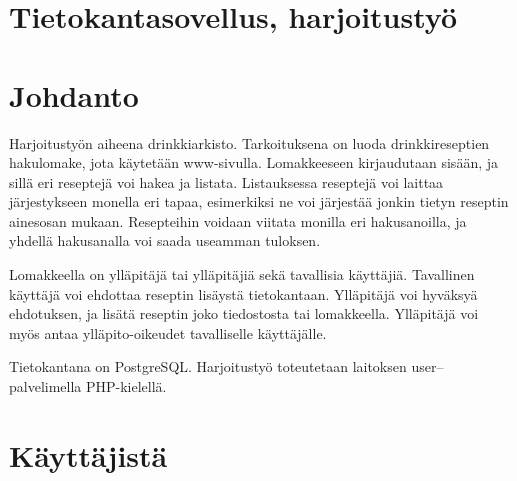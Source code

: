 \documentclass[a4paper]{article}
\begin{document}
\section*{Tietokantasovellus, harjoitustyö}

\tableofcontents

\section{Johdanto}

Harjoitustyön aiheena drinkkiarkisto. Tarkoituksena on luoda drinkkireseptien hakulomake, jota käytetään www-sivulla. Lomakkeeseen kirjaudutaan sisään, ja sillä eri reseptejä voi hakea ja listata. Listauksessa reseptejä voi laittaa järjestykseen monella eri tapaa, esimerkiksi ne voi järjestää jonkin tietyn reseptin ainesosan mukaan. Resepteihin voidaan viitata monilla eri hakusanoilla, ja yhdellä hakusanalla voi saada useamman tuloksen. 

Lomakkeella on ylläpitäjä tai ylläpitäjiä sekä tavallisia käyttäjiä. Tavallinen käyttäjä voi ehdottaa reseptin lisäystä tietokantaan. Ylläpitäjä voi hyväksyä ehdotuksen, ja lisätä reseptin joko tiedostosta tai lomakkeella. Ylläpitäjä voi myös antaa ylläpito-oikeudet tavalliselle käyttäjälle. 

Tietokantana on PostgreSQL. Harjoitustyö toteutetaan laitoksen user--palvelimella PHP-kielellä. 

%

\newpage
\section{Käyttäjistä}
\end{document}
